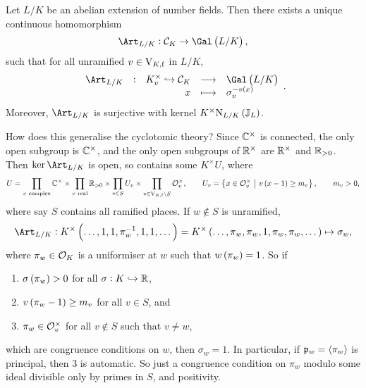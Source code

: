 \begin{theorem*}
Let $ L / K $ be an abelian extension of number fields. Then there exists a unique continuous homomorphism
$$ \Art_{L / K} : \CCC_K \to \Gal\br{L / K}, $$
such that for all unramified $ v \in \mathrm{V}_{K, \mathrm{f}} $ in $ L / K $,
$$ \function[\Art_{L / K}]{K_v^\times \hookrightarrow \CCC_K}{\Gal\br{L / K}}{x}{\sigma_v^{-v\br{x}}}. $$
Moreover, $ \Art_{L / K} $ is surjective with kernel $ K^\times \N_{L / K}\br{\JJ_L} $.
\end{theorem*}

How does this generalise the cyclotomic theory? Since $ \mathbb{C}^\times $ is connected, the only open subgroup is $ \mathbb{C}^\times $, and the only open subgroups of $ \mathbb{R}^\times $ are $ \mathbb{R}^\times $ and $ \mathbb{R}_{> 0} $. Then $ \ker \Art_{L / K} $ is open, so contains some $ K^\times U $, where
$$ U = \prod_{v \ \text{complex}} \CC^\times \times \prod_{v \ \text{real}} \RR_{> 0} \times \prod_{v \in S} U_v \times \prod_{v \in \V_{K, \f} \setminus S} \OOO_v^\times, \qquad U_v = \cbr{x \in \OOO_v^\times \st v\br{x - 1} \ge m_v}, \qquad m_v > 0, $$
where say $ S $ contains all ramified places. If $ w \notin S $ is unramified,
$$ \Art_{L / K} : K^\times\br{\dots, 1, 1, \pi_w^{-1}, 1, 1, \dots} = K^\times\br{\dots, \pi_w, \pi_w, 1, \pi_w, \pi_w, \dots} \mapsto \sigma_w, $$
where $ \pi_w \in \mathcal{O}_K $ is a uniformiser at $ w $ such that $ w\br{\pi_w} = 1 $. So if
\begin{enumerate}
\item $ \sigma\br{\pi_w} > 0 $ for all $ \sigma : K \hookrightarrow \mathbb{R} $,
\item $ v\br{\pi_w - 1} \ge m_v $ for all $ v \in S $, and
\item $ \pi_w \in \mathcal{O}_v^\times $ for all $ v \notin S $ such that $ v \ne w $,
\end{enumerate}
which are congruence conditions on $ w $, then $ \sigma_w = 1 $. In particular, if $ \mathfrak{p}_w = \left\langle \pi_w \right\rangle $ is principal, then $ 3 $ is automatic. So just a congruence condition on $ \pi_w $ modulo some ideal divisible only by primes in $ S $, and positivity.

\pagebreak

